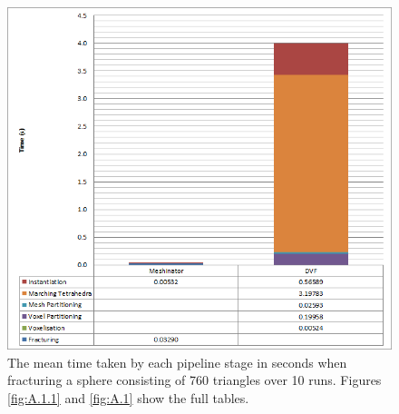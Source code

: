 \begin{figure}[h!]
\centerline{\includegraphics[scale=0.75]{../Logs/single_sphere_latency.png}}
\caption{The mean time taken by each pipeline stage in seconds when fracturing a sphere consisting of 760 triangles over 10 runs. Figures \ref{fig:A.1.1} and \ref{fig:A.1} show the full tables.}
\label{fig:4.10.1}
\end{figure}

\FloatBarrier

